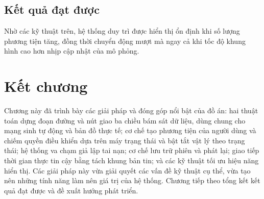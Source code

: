 ﻿\documentclass[../DoAn.tex]{subfiles}
\begin{document}
\subsection{Kết quả đạt được}

Nhờ các kỹ thuật trên, hệ thống duy trì được hiển thị ổn định khi số lượng phương
tiện tăng, đồng thời chuyển động mượt mà ngay cả khi tốc độ khung hình cao hơn
nhịp cập nhật của mô phỏng.

\section{Kết chương}

Chương này đã trình bày các giải pháp và đóng góp nổi bật của đồ án: hai thuật
toán dựng đoạn đường và nút giao ba chiều bám sát dữ liệu, dùng chung cho mạng
sinh tự động và bản đồ thực tế; cơ chế tạo phương tiện của người dùng và chiếm
quyền điều khiển dựa trên máy trạng thái và bật tắt vật lý theo trạng thái; hệ
thống va chạm giả lập tai nạn; cơ chế lưu trữ phiên và phát lại; giao tiếp thời
gian thực tin cậy bằng tách khung bản tin; và các kỹ thuật tối ưu hiệu năng hiển thị. Các giải pháp này vừa giải quyết
các vấn đề kỹ thuật cụ thể, vừa tạo nên những tính năng làm nên giá trị của hệ
thống. Chương tiếp theo tổng kết kết quả đạt được và đề xuất hướng phát triển.
\end{document}
